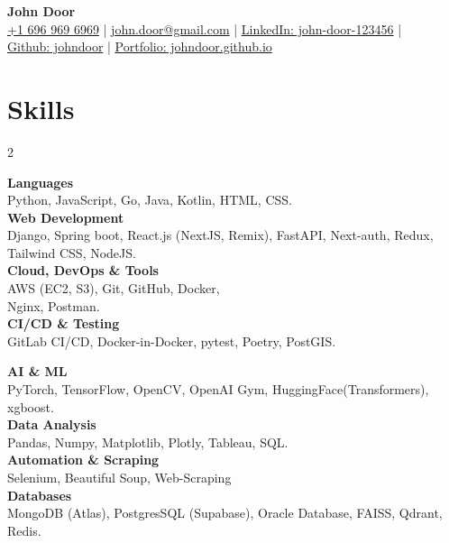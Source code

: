 \documentclass[a4paper,10pt]{article}
\begin{document}
	
	\begin{center}
		{\LARGE \textbf{John Door}}\\[4pt]
		\href{tel:+1 6969696969}{+1 696 969 6969} \;|\;
		\href{mailto:john.door@gmail.com}{john.door@gmail.com} \;|\;
		\href{https://www.linkedin.com/in/john-door-123456/}{\underline{LinkedIn:} john-door-123456} \;|\;\\
		\href{https://github.com/johndoor}{\underline{Github:} johndoor} \;|\;
		\href{https://johndoor.github.io}{\underline{Portfolio:} johndoor.github.io}
	\end{center}
	
	\section{Skills}
	
	\begin{center}
		\begin{minipage}{0.95\textwidth}
			\begin{multicols}{2}
				
				\textbf{Languages} \\
				Python, JavaScript, Go, Java, Kotlin, HTML, CSS.\\
				
				\textbf{Web Development} \\
				Django, Spring boot, React.js (NextJS, Remix), FastAPI, Next-auth, Redux, Tailwind CSS, NodeJS. \\
				
				\textbf{Cloud, DevOps \& Tools} \\
				AWS (EC2, S3), Git, GitHub, Docker,\\ Nginx, Postman. \\
				
				\textbf{CI/CD \& Testing} \\
				GitLab CI/CD, Docker-in-Docker, pytest, Poetry, PostGIS. \\
				
				\columnbreak
				
				\textbf{AI \& ML} \\
				PyTorch, TensorFlow, OpenCV, OpenAI Gym, HuggingFace(Transformers), xgboost.\\
				
				\textbf{Data Analysis} \\
				Pandas, Numpy, Matplotlib, Plotly, Tableau, SQL.\\
				
				\textbf{Automation \& Scraping} \\
				Selenium, Beautiful Soup, Web-Scraping\\
				
				\textbf{Databases} \\
				MongoDB (Atlas), PostgresSQL (Supabase), Oracle Database, FAISS, Qdrant, Redis. \\
				
			\end{multicols}
		\end{minipage}
	\end{center}
	
\end{document}
